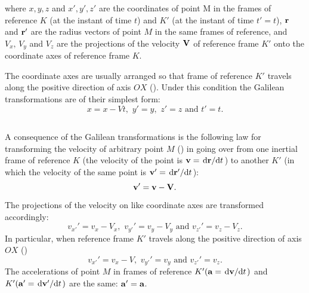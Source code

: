 where $x, y, z$ and $x', y', z'$ are the coordinates of point M in the frames of reference $K$ (at the instant of time $t$) and $K'$ (at the instant of time $t' = t$), $\vb{r}$ and $\vb{r}'$ are the radius vectors of point $M$ in the same frames of reference, and $V_{x},\, V_{y}$ and $V_{z}$ are the projections of the velocity $\vb{V}$ of reference frame $K'$ onto the coordinate axes of reference frame $K$.

The coordinate axes are usually arranged so that frame of ref­erence $K'$ travels along the positive direction of axis $OX$ (). Under this condition the Galilean transformations are of their simplest form:
\begin{equation*}%
x = x - Vt, \,\,y' = y, \,\,z'= z \,\,\textrm{and}\,\, t' = t.
\end{equation*}

\subsection{}\label{2.8.2} A consequence of the Galilean transformations is the following law for transforming the velocity of arbitrary point $M$ () in going over from one inertial frame of reference $K$ (the velocity of the point is $\vb{v} = \dv*{\vb{r}}{t}$) to another $K'$ (in which the velocity of the same point is $\vb{v}' = \dv*{\vb{r}'}{t}$):
\begin{equation*}%
\vb{v}' = \vb{v} - \vb{V}.
\end{equation*}
The projections of the velocity on like coordinate axes are transformed accordingly:
\begin{equation*}%
v_{x'}' = v_{x} - V_{x}, \,\,v_{y'}' = v_{y} - V_{y} \,\,\textrm{and}\,\,v_{z'}' = v_{z} - V_{z} .
\end{equation*}
In particular, when reference frame $K'$ travels along the positive direction of axis $OX$ ()
\begin{equation*}%
v_{x'}' = v_{x} - V, \,\,v_{y'}' = v_{y} \,\,\textrm{and}\,\,v_{z'}' = v_{z}.
\end{equation*}
The accelerations of point $M$ in frames of reference $K' (\vb{a} =\dv*{\vb{v}}{t})$ and $K' (\vb{a}' =\dv*{\vb{v}'}{t})$ are the same: $\vb{a}' = \vb{a}$.

